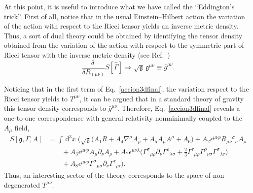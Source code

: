 \documentclass{ws-mpla}
\renewcommand{\(}{\left(}
\renewcommand{\)}{\right)}
\renewcommand{\[}{\left[}
\renewcommand{\]}{\right]}
\newcommand{\dn}[2]{\,{\mathrm{d}}^{#1}\!{#2}\;}
\begin{document}
At this point, it is useful to introduce what we have called the ``Eddington's trick''.\cite{Eddington1923math} First of all, notice that in the usual Einstein--Hilbert action the variation of the action with respect to the Ricci tensor yields an inverse metric density. Thus, a sort of dual theory could be obtained by identifying the tensor density obtained from the variation of the action with respect to the symmetric part of Ricci tensor with the inverse metric density (see Ref.~)
\begin{equation}
  \label{metric}
  \frac{\delta\ }{\delta R_{(\mu\nu)}} S[\hat{\Gamma}] \Longrightarrow \sqrt{\mathfrak{g}} \, \mathfrak{g}^{\mu\nu} \equiv \bar{g}^{\mu\nu}.
\end{equation}

Noticing that in  the first term of Eq.~\eqref{accion3dfinal}, the variation respect to the Ricci tensor yields to $T^{\mu\nu}$, it can be argued that in a standard theory of gravity this tensor density corresponds to $\bar{g}^{\mu\nu}$. Therefore, Eq.~\eqref{accion3dfinal} reveals a one-to-one correspondence with general relativity nonminimally coupled to the $A_\mu$ field,
\begin{equation}
  \label{accion3dGR}
  \begin{split}
    S[\mathfrak{g},{\Gamma},A] &= \int \dn{3}{x} \bigg(
    \sqrt{\mathfrak{g}} \Big(  A_1 {R} + A_4{\nabla}^\mu A_\mu + A_5 A_\mu A^\mu + A_6  \Big)
    + A_2\epsilon^{\mu\nu\rho} {R}_{\mu\nu}{}^{\sigma}{}_\sigma A_\rho
    \\
    & \qquad + A_3\epsilon^{\mu\nu\rho}A_\mu\partial_\nu A_\rho
    + A_7\epsilon^{\mu\nu\lambda}\Big({\Gamma}^{\sigma}{}_{\mu\rho}\partial_\nu{\Gamma}^{\rho}{}_{\lambda\sigma}
    + \frac{2}{3}{\Gamma}^{\tau}{}_{\mu\rho}{\Gamma}^{\rho}{}_{\nu\sigma}{}{\Gamma}^{\sigma}{}_{\lambda\tau}{}\Big)   
    \\
    & \qquad + A_8\epsilon^{\mu\nu\rho}{\Gamma}^{\sigma}{}_{\mu\sigma}\partial_\nu{\Gamma}^{\tau}{}_{\rho\tau}
    \bigg).
  \end{split}
\end{equation}
Thus, an interesting sector of the theory corresponds to the space of non-degenerated $T^{\mu\nu}$. 
\end{document}
